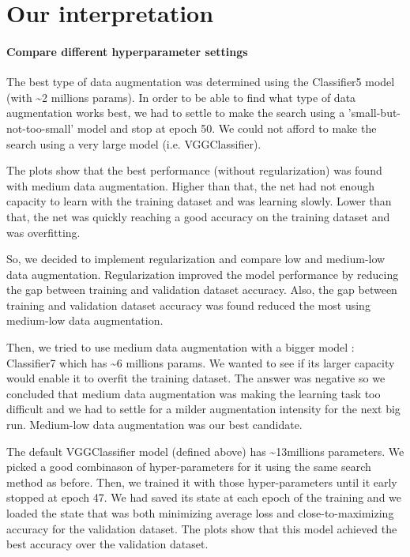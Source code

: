 \documentclass[11pt]{article}
\begin{document}
    \section{Our interpretation}\label{our-interpretation}

\paragraph{Compare different hyperparameter
settings}\label{compare-different-hyperparameter-settings}

The best type of data augmentation was determined using the Classifier5
model (with \textasciitilde{}2 millions params). In order to be able to
find what type of data augmentation works best, we had to settle to make
the search using a 'small-but-not-too-small' model and stop at epoch 50.
We could not afford to make the search using a very large model (i.e.
VGGClassifier).

The plots show that the best performance (without regularization) was
found with medium data augmentation. Higher than that, the net had not
enough capacity to learn with the training dataset and was learning
slowly. Lower than that, the net was quickly reaching a good accuracy on
the training dataset and was overfitting.

So, we decided to implement regularization and compare low and
medium-low data augmentation. Regularization improved the model
performance by reducing the gap between training and validation dataset
accuracy. Also, the gap between training and validation dataset accuracy
was found reduced the most using medium-low data augmentation.

Then, we tried to use medium data augmentation with a bigger model :
Classifier7 which has \textasciitilde{}6 millions params. We wanted to
see if its larger capacity would enable it to overfit the training
dataset. The answer was negative so we concluded that medium data
augmentation was making the learning task too difficult and we had to
settle for a milder augmentation intensity for the next big run.
Medium-low data augmentation was our best candidate.

The default VGGClassifier model (defined above) has
\textasciitilde{}13millions parameters. We picked a good combinason of
hyper-parameters for it using the same search method as before. Then, we
trained it with those hyper-parameters until it early stopped at epoch
47. We had saved its state at each epoch of the training and we loaded
the state that was both minimizing average loss and close-to-maximizing
accuracy for the validation dataset. The plots show that this model
achieved the best accuracy over the validation dataset.
\end{document}
